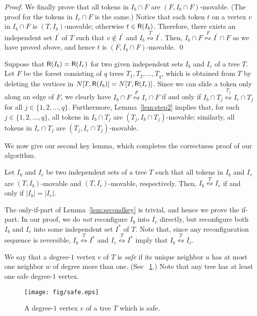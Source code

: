 \documentclass{llncs}
\newcommand{\msize}[1]{{\left|#1\right|}}
\newcommand{\Neiclosed}[2]{N[#1, #2]}
\newcommand{\bfI}{I}
\newcommand{\sevstep}{\leftrightsquigarrow}
\newcommand{\sevstepT}[1]{\overset{#1}{\sevstep}}
\newcommand{\ImSet}[1]{{\sf R}(\bfI_{#1})}
\newcommand{\Forest}{F}
\newcommand{\numq}{q}
\newcommand{\bfIstar}{\bfI^*}
\newcounter{one}
\newcounter{two}
\begin{document}
\begin{proof}
	We finally prove that all tokens in $\bfI_b \cap \Forest$ are $(\Forest, \bfI_b \cap \Forest)$-movable.
(The proof for the tokens in $\bfI_r \cap \Forest$ is the same.)
	Notice that each token $t$ on a vertex $v$ in $\bfI_b \cap \Forest$ is $(T, \bfI_b)$-movable; otherwise $t \in \ImSet{b}$. 
	Therefore, there exists an independent set $\bfI^\prime$ of $T$ such that $v \not\in \bfI^\prime$ and $\bfI_b \sevstepT{T} \bfI^\prime$. 
	Then, $\bfI_b \cap \Forest \sevstepT{\Forest} \bfI^\prime \cap \Forest$ as we have proved above, and hence $t$ is $(\Forest, \bfI_b \cap \Forest)$-movable.
	\qed
	\end{proof}


	Suppose that $\ImSet{b} = \ImSet{r}$ for two given independent sets $\bfI_b$ and $\bfI_r$ of a tree $T$.
	Let $\Forest$ be the forest consisting of $\numq$ trees $T_1, T_2, \ldots, T_{\numq}$, which is obtained from $T$ by deleting the vertices in $\Neiclosed{T}{\ImSet{b}} = \Neiclosed{T}{\ImSet{r}}$. 
	Since we can slide a token only along an edge of $\Forest$, we clearly have $\bfI_b \cap \Forest \sevstepT{\Forest} \bfI_r \cap \Forest$ if and only if $\bfI_b \cap T_j \sevstepT{T_j} \bfI_r \cap T_j$ for all $j \in \{1, 2, \ldots, \numq \}$.
	Furthermore, Lemma~\ref{lem:step2} implies that, for each $j \in \{1,2, \ldots, \numq\}$, all tokens in $\bfI_b \cap T_j$ are $(T_j, \bfI_b \cap T_j)$-movable;
similarly, all tokens in $\bfI_r \cap T_j$ are $(T_j, \bfI_r \cap T_j)$-movable. 
\medskip

	We now give our second key lemma, which completes the correctness proof of our algorithm. 
	\begin{lemma} \label{lem:secondkey}
	Let $\bfI_b$ and $\bfI_r$ be two independent sets of a tree $T$ such that all tokens in $\bfI_b$ and $\bfI_r$ are $(T, \bfI_b)$-movable and $(T, \bfI_r)$-movable, respectively.
	Then, $\bfI_b \sevstepT{T} \bfI_r$ if and only if $\msize{\bfI_b} = \msize{\bfI_r}$. 
\end{lemma}
	
	The only-if-part of Lemma~\ref{lem:secondkey} is trivial, and hence we prove the if-part.
	In our proof, we do \emph{not} reconfigure $\bfI_b$ into $\bfI_r$ directly, but reconfigure both $\bfI_b$ and $\bfI_r$ into some independent set $\bfIstar$ of $T$. 
Note that, since any reconfiguration sequence is reversible, $\bfI_b \sevstepT{T} \bfIstar$ and $\bfI_r \sevstepT{T} \bfIstar$ imply that $\bfI_b \sevstepT{T} \bfI_r$.


	We say that a degree-$1$ vertex $v$ of $T$ is \emph{safe} if its unique neighbor $u$ has at most one neighbor $w$ of degree more than one.
(See \figurename~\ref{fig:safe}.) 
	Note that any tree has at least one safe degree-$1$ vertex. 
\begin{figure}[t]
\begin{center}
	\texttt{[image: fig/safe.eps]}
	\end{center}
	\vspace{-1em}
	\caption{A degree-$1$ vertex $v$ of a tree $T$ which is safe.}
	\label{fig:safe}
\end{figure}
\end{document}
